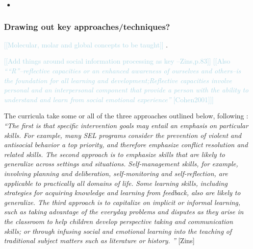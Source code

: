 \documentclass[prodmode,acmtochi]{acmsmall}
\newcommand{\todo}[1]{\textrm{\textrm{\textcolor{LightBlue}{[[#1]]} } } }
\newcommand{\qq}[2]{\textrm{\textit{``#2''}}{ [#1]}}
\begin{document}
\begin{itemize}
	\item 
\end{itemize}

\subsubsection{Drawing out key approaches/techniques?}
\todo{Molecular, molar and global concepts to be taught}. 

\todo{Add things around social information processing as key --Zins,p.83} 
\todo{Also \qq{Cohen2001}{“R”--reflective capacities or an enhanced awareness of ourselves and others--is the foundation for all learning and development;Reflective capacities involve personal and an interpersonal component that provide a person with the ability to understand and learn from social emotional experience}}



The curricula take some or all of the three approaches outlined below, following \cite[p.81]{Zins}: 
%
\qq{Zins}{The first is that specific intervention goals may entail an emphasis on particular skills. For example, many SEL programs consider the prevention of violent and antisocial behavior a top priority, and therefore emphasize conflict resolution and related skills. 
%
The second approach is to emphasize skills that are likely to generalize across settings and situations. Self-management skills, for example, involving planning and deliberation, self-monitoring and self-reflection, are applicable to practically all domains of life. Some learning skills, including strategies for acquiring knowledge and learning from feedback, also are likely to generalize.
%
The third approach is to capitalize on implicit or informal learning, such as taking advantage of the everyday problems and disputes as they arise in the classroom to help children develop perspective taking and communication skills; or through infusing social and emotional learning into the teaching of traditional subject matters such as literature or history. }
\end{document}
